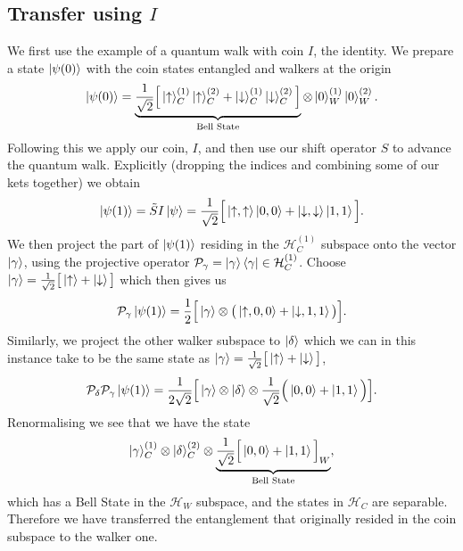 \subsection{\texorpdfstring{Transfer using $I$}{Transfer using \emph{I}}}
We first use the example of a quantum walk with coin $I$, the identity. We prepare a state $\ket{\psi(0)}$ with the coin states entangled and walkers at the origin
\begin{equation}
    \ket{\psi(0)} = \underbrace{\frac{1}{\sqrt{2}}\Big [\ket{\uparrow}^{(1)}_C\ket{\uparrow}^{(2)}_C + \ket{\downarrow}^{(1)}_C\ket{\downarrow}^{(2)}_C \Big]}_{\text{Bell State}}\otimes \ket{0}^{(1)}_W\ket{0}^{(2)}_W.
\end{equation}
Following this we apply our coin, $I$, and then use our shift operator $S$ to advance the quantum walk. Explicitly (dropping the indices and combining some of our kets together) we obtain
\begin{equation}
    \ket{\psi(1)} = \tilde{S}I\ket{\psi} = \frac{1}{\sqrt{2}}\Big [\ket{\uparrow,\uparrow}\ket{0,0} + \ket{\downarrow,\downarrow}\ket{1,1}\Big].
\end{equation}
We then project the part of $\ket{\psi(1)}$ residing in the $\mathcal{H}^{(1)}_C$ subspace onto the vector $\ket{\gamma}$, using the projective operator $\mathcal{P}_\gamma = \ket{\gamma}\bra{\gamma} \in \mathcal{H}^{(1)}_C$. Choose $\ket{\gamma} = \frac{1}{\sqrt{2}} \big [\ket{\uparrow} + \ket{\downarrow} \big]$ which then gives us
\begin{equation}
    \mathcal{P}_\gamma \ket{\psi(1)} = \frac{1}{2}\Big [\ket{\gamma}\otimes \big (\ket{\uparrow, 0, 0} + \ket{\downarrow, 1, 1}\big )\Big ].
\end{equation}
Similarly, we project the other walker subspace to $\ket{\delta}$ which we can in this instance take to be the same state as $\ket{\gamma} = \frac{1}{\sqrt{2}} \big [\ket{\uparrow} + \ket{\downarrow} \big]$,
\begin{equation}
    \mathcal{P}_\delta \mathcal{P}_\gamma \ket{\psi(1)} = \frac{1}{2\sqrt{2}}\Big [\ket{\gamma}\otimes \ket{\delta} \otimes \frac{1}{\sqrt{2}}\Big (\ket{0, 0} + \ket{1, 1}\Big )\Big ].
\end{equation}
Renormalising we see that we have the state
\begin{equation}
    \ket{\gamma}^{(1)}_C \otimes \ket{\delta}^{(2)}_C \otimes \underbrace{\frac{1}{\sqrt{2}}\Big [\ket{0, 0} + \ket{1, 1}\Big ]_W}_{\text{Bell State}},
\end{equation}
which has a Bell State in the $\mathcal{H}_W$ subspace, and the states in $\mathcal{H}_C$ are separable. Therefore we have transferred the entanglement that originally resided in the coin subspace to the walker one.

